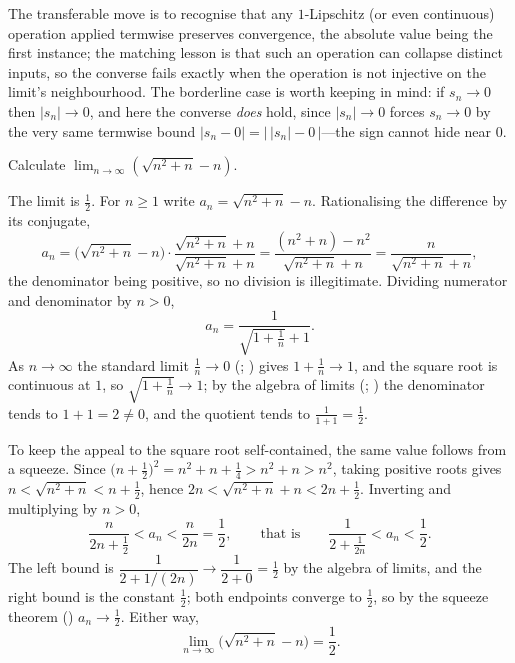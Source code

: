 \documentclass[main.tex]{subfiles}
\begin{document}
\begin{Reflection}
The transferable move is to recognise that any $1$-Lipschitz (or even continuous) operation applied
termwise preserves convergence, the absolute value being the first instance; the matching lesson is that
such an operation can collapse distinct inputs, so the converse fails exactly when the operation is not
injective on the limit's neighbourhood. The borderline case is worth keeping in mind: if $s_n\to 0$ then
$|s_n|\to 0$, and here the converse \emph{does} hold, since $|s_n|\to 0$ forces $s_n\to 0$ by the very
same termwise bound $|s_n-0|=\bigl|\,|s_n|-0\,\bigr|$---the sign cannot hide near $0$.
\end{Reflection}

Calculate $\displaystyle\lim_{n\to\infty} \left(\sqrt{n^{2}+n} - n\right)$.

\begin{Solution}
The limit is $\tfrac12$. For $n\ge 1$ write $a_n=\sqrt{n^2+n}-n$. Rationalising the difference by its
conjugate,
\[
a_n=\bigl(\sqrt{n^2+n}-n\bigr)\cdot\frac{\sqrt{n^2+n}+n}{\sqrt{n^2+n}+n}
=\frac{(n^2+n)-n^2}{\sqrt{n^2+n}+n}=\frac{n}{\sqrt{n^2+n}+n},
\]
the denominator being positive, so no division is illegitimate. Dividing numerator and denominator by
$n>0$,
\[
a_n=\frac{1}{\sqrt{1+\tfrac1n}+1}.
\]
As $n\to\infty$ the standard limit $\tfrac1n\to 0$ (; )
gives $1+\tfrac1n\to 1$, and the square root is continuous at $1$, so $\sqrt{1+\tfrac1n}\to 1$; by the
algebra of limits (; ) the
denominator tends to $1+1=2\neq 0$, and the quotient tends to $\tfrac1{1+1}=\tfrac12$.

To keep the appeal to the square root self-contained, the same value follows from a squeeze. Since
$\bigl(n+\tfrac12\bigr)^2=n^2+n+\tfrac14>n^2+n>n^2$, taking positive roots gives
$n<\sqrt{n^2+n}<n+\tfrac12$, hence $2n<\sqrt{n^2+n}+n<2n+\tfrac12$. Inverting and multiplying by $n>0$,
\[
\frac{n}{2n+\tfrac12}<a_n<\frac{n}{2n}=\frac12,
\qquad\text{that is}\qquad
\frac{1}{2+\tfrac1{2n}}<a_n<\frac12 .
\]
The left bound is $\dfrac{1}{2+1/(2n)}\to\dfrac{1}{2+0}=\tfrac12$ by the algebra of limits, and the
right bound is the constant $\tfrac12$; both endpoints converge to $\tfrac12$, so by the squeeze theorem
() $a_n\to\tfrac12$. Either way,
\[
\lim_{n\to\infty}\bigl(\sqrt{n^2+n}-n\bigr)=\frac12 .
\]
\end{Solution}
\end{document}
